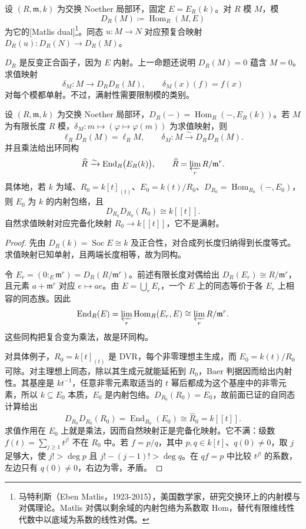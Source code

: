 \begin{definition}\label{b3:def:matlis-dual}
	设 \((R,\mathfrak m,k)\) 为交换 Noether 局部环，固定 \(E=E_R(k)\)。对 \(R\) 模 \(M\)，模
	\[
		D_R(M)\coloneqq\operatorname{Hom}_R(M,E)
	\]
	为它的[Matlis dual]\footnote{马特利斯（Eben Matlis，1923-2015），美国数学家，研究交换环上的内射模与对偶理论。Matlis 对偶以剩余域的内射包络为系数取 Hom，替代有限维线性代数中以底域为系数的线性对偶。}。同态 \(u:M\rightarrow N\) 对应预复合映射 \(D_R(u):D_R(N)\rightarrow D_R(M)\)。
\end{definition}

\(D_R\) 是反变正合函子，因为 \(E\) 内射。上一命题还说明 \(D_R(M)=0\) 蕴含 \(M=0\)。求值映射
\[
	\delta_M:M\longrightarrow D_RD_R(M), \qquad \delta_M(x)(f)=f(x)
\]
对每个模都单射。不过，满射性需要限制模的类别。

\begin{lemma}\label{b3:lem:matlis-finite-length}
	设 \((R,\mathfrak m,k)\) 为交换 Noether 局部环，\(D_R(-)=\operatorname{Hom}_R(-,E_R(k))\)。若 \(M\) 为有限长度 \(R\) 模，\(\delta_M:m\mapsto(\varphi\mapsto\varphi(m))\) 为求值映射，则
	\[
		\ell_R D_R(M)=\ell_R M, \qquad \delta_M:M\xrightarrow{\sim}D_RD_R(M).
	\]
	并且乘法给出环同构
	\[
		\widehat R\xrightarrow{\sim}\operatorname{End}_R\bigl(E_R(k)\bigr), \qquad \widehat R=\varprojlim_r R/\mathfrak m^r.
	\]
	具体地，若 \(k\) 为域、\(R_0=k[t]_{(t)}\)、\(E_0=k(t)/R_0\)、\(D_{R_0}=\operatorname{Hom}_{R_0}(-,E_0)\)，则 \(E_0\) 为 \(k\) 的内射包络，且
	\[
		D_{R_0}D_{R_0}(R_0)\cong k[\![t]\!].
	\]
	自然求值映射对应完备化映射 \(R_0\to k[\![t]\!]\)，它不是满射。
\end{lemma}
\begin{proof}
	先由 \(D_R(k)=\operatorname{Soc}E\cong k\) 及正合性，对合成列长度归纳得到长度等式。求值映射已知单射，且两端长度相等，故为同构。

	令 \(E_r=(0:_E\mathfrak m^r)=D_R(R/\mathfrak m^r)\)。前述有限长度对偶给出 \(D_R(E_r)\cong R/\mathfrak m^r\)，且元素 \(a+\mathfrak m^r\) 对应 \(e\mapsto ae\)。由 \(E=\bigcup_rE_r\)，一个 \(E\) 上的同态等价于各 \(E_r\) 上相容的同态族。因此
	\[
		\operatorname{End}_R(E) =\varprojlim_r\operatorname{Hom}_R(E_r,E) \cong\varprojlim_rR/\mathfrak m^r.
	\]
	这些同构把复合变为乘法，故是环同构。

	对具体例子，\(R_0=k[t]_{(t)}\) 是 DVR，每个非零理想主生成，而 \(E_0=k(t)/R_0\) 可除。对主理想上同态，除以其生成元就能延拓到 \(R_0\)，Baer 判据因而给出内射性。其基座是 \(kt^{-1}\)，任意非零元素取适当的 \(t\) 幂后都成为这个基座中的非零元素，所以 \(k\subseteq E_0\) 本质，\(E_0\) 是内射包络。\(D_{R_0}(R_0)=E_0\)，故前面已证的自同态计算给出
	\[
		D_{R_0}D_{R_0}(R_0)=\operatorname{End}_{R_0}(E_0) \cong\widehat R_0=k[\![t]\!].
	\]
	求值作用在 \(E_0\) 上就是乘法，因而自然映射正是完备化映射。它不满：级数 \(f(t)=\sum_{j\ge1}t^{j!}\) 不在 \(R_0\) 中。若 \(f=p/q\)，其中 \(p,q\in k[t]\)、\(q(0)\ne0\)，取 \(j\) 足够大，使 \(j!>\deg p\) 且 \(j!-(j-1)!>\deg q\)。在 \(qf=p\) 中比较 \(t^{j!}\) 的系数，左边只有 \(q(0)\ne0\)，右边为零，矛盾。
\end{proof}

